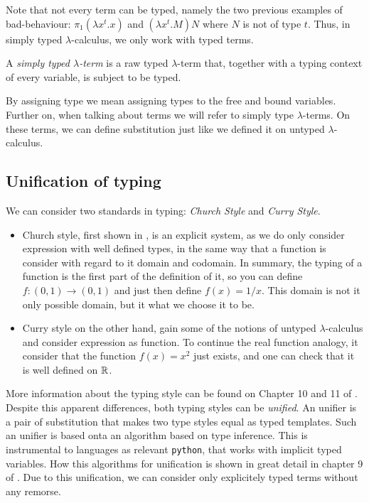 Note that not every term can be typed, namely the two previous examples of bad-behaviour: $\pi_1(\lambda x^t. x)$ and $(\lambda x^t.M)N$ where $N$ is not of type $t$. Thus, in simply typed $\lambda$-calculus, we only work with typed terms.

\begin{definition}
  A \emph{simply typed $\lambda$-term} is a raw typed $\lambda$-term that, together with a typing context of every variable, is subject to be typed.
\end{definition}

By assigning type we mean assigning types to the free and bound variables. Further on, when talking about terms we will refer to simply type $\lambda$-terms. On these terms, we can define substitution just like we defined it on untyped $\lambda$-calculus.

\subsection{Unification of typing}

We can consider two standards in typing: \emph{Church Style} and \emph{Curry Style}.
\begin{itemize}
\item Church style,  first shown in \cite{church1940formulation}, is an explicit system, as we do only consider expression with well defined types, in the same way that a function is consider with regard to it domain and codomain. In summary, the typing of a function is the first part of the definition of it, so you can define $f:(0,1)\to (0,1)$ and just then define $f(x)=1/x$. This domain is not it only possible domain, but it what we choose it to be. 
\item Curry style on the other hand, gain some of the notions of untyped $\lambda$-calculus and consider expression as function. To continue the real function analogy, it consider that the function $f(x)=x^2$ just exists, and one can check that it is well defined on $\mathbb{R}$. \\
\end{itemize}
More information about the typing style can be found on Chapter 10 and 11 of \cite{hindley2008lambda}. \\

Despite this apparent differences, both typing styles can be \emph{unified}. An unifier is a pair of substitution that makes two type styles equal as typed templates. Such an unifier is based onta an algorithm based on type inference. This is instrumental to languages  as relevant \texttt{python}, that works with implicit typed variables. How this algorithms for unification is shown in great detail in chapter 9  of \cite{selinger2008lecture}. Due to this unification, we can consider only explicitely typed terms without any remorse.

